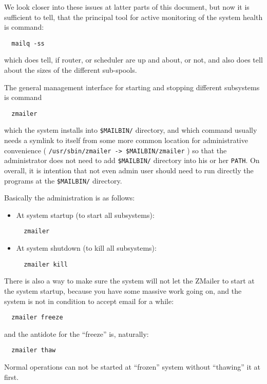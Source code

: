 We look closer into these issues at latter parts of this document,
but now it is sufficient to tell, that the principal tool for active
monitoring of the system health is command:
\begin{verbatim}
  mailq -ss
\end{verbatim}

which does tell, if router, or scheduler are up and about, or not,
and also does tell about the sizes of the different sub-spools.

The general management interface for starting and stopping different
subsystems is command
\begin{verbatim}
  zmailer
\end{verbatim}

which the system installs into {\tt \$MAILBIN/} directory, and which command
usually needs a symlink to itself from some more common location for
administrative convenience
( {\tt /usr/sbin/zmailer -> \$MAILBIN/zmailer} )
so that the administrator does not need to add  {\tt \$MAILBIN/}  directory
into his or her {\tt PATH}.   On overall, it is intention that not even 
admin user should need to run directly the programs at the {\tt \$MAILBIN/}
directory.

Basically the administration is as follows:
\begin{itemize}
\item
At system startup (to start all subsystems):
\begin{verbatim}
  zmailer
\end{verbatim}
\item
At system shutdown (to kill all subsystems):
\begin{verbatim}
  zmailer kill
\end{verbatim}
\end{itemize}

There is also a way to make sure the system will not let the ZMailer
to start at the system startup, because you have some massive work
going on, and the system is not in condition to accept email for a while: 
\nopagebreak
\begin{verbatim}
  zmailer freeze
\end{verbatim}

and the antidote for the ``freeze'' is, naturally:
\nopagebreak
\begin{verbatim}
  zmailer thaw
\end{verbatim}

Normal operations can not be started at ``frozen'' system without
``thawing'' it at first.

